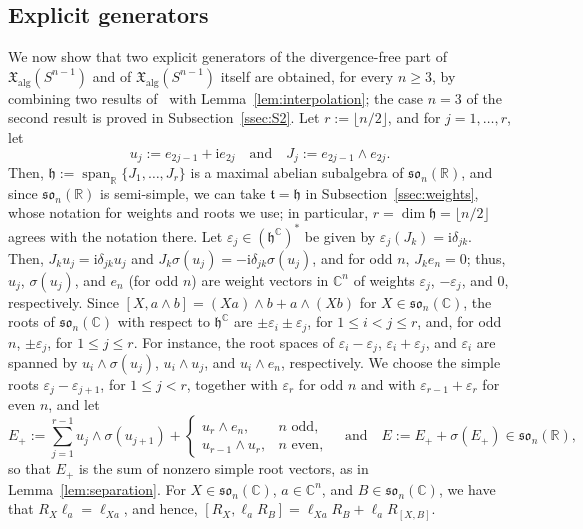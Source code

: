 \documentclass{article}
\newcommand{\R}{\mathbb{R}}
\newcommand{\C}{\mathbb{C}}
\newcommand{\frakt}{\mathfrak{t}}
\newcommand{\frakh}{\mathfrak{h}}
\newcommand{\xalg}{\mathfrak X_{\mathrm{alg}}}
\theoremstyle{definition}
\theoremstyle{plain}
\begin{document}
\subsection{Explicit generators}\label{ssec:lukatskii}

We now show that two explicit generators of the divergence-free part of $\xalg(S^{n-1})$ and of $\xalg(S^{n-1})$ itself are obtained, for every $n\geq3$, by combining two results of~\cite{Luk77} with Lemma~\ref{lem:interpolation}; the case $n=3$ of the second result is proved in Subsection~\ref{ssec:S2}.
Let $r:=\lfloor n/2\rfloor$, and for $j=1,\ldots,r$, let
$$
    u_j:=e_{2j-1}+\mathrm{i}e_{2j} \quad\mbox{and}\quad
    J_j:=e_{2j-1}\wedge e_{2j}.
$$
Then, $\frakh:=\operatorname{span}_\R\{J_1,\ldots,J_r\}$ is a maximal abelian subalgebra of $\mathfrak{so}_n(\R)$, and since $\mathfrak{so}_n(\R)$ is semi-simple, we can take $\frakt=\frakh$ in Subsection~\ref{ssec:weights}, whose notation for weights and roots we use; in particular, $r=\dim\frakh=\lfloor n/2\rfloor$ agrees with the notation there.
Let $\varepsilon_j\in(\frakh^\C)^*$ be given by $\varepsilon_j(J_k)=\mathrm{i}\delta_{jk}$.
Then, $J_ku_j=\mathrm{i}\delta_{jk}u_j$ and $J_k\sigma(u_j)=-\mathrm{i}\delta_{jk}\sigma(u_j)$, and for odd $n$, $J_ke_n=0$; thus, $u_j$, $\sigma(u_j)$, and $e_n$ (for odd $n$) are weight vectors in $\C^n$ of weights $\varepsilon_j$, $-\varepsilon_j$, and $0$, respectively.
Since $[X,a\wedge b]=(Xa)\wedge b+a\wedge(Xb)$ for $X\in\mathfrak{so}_n(\C)$, the roots of $\mathfrak{so}_n(\C)$ with respect to $\frakh^\C$ are $\pm\varepsilon_i\pm\varepsilon_j$, for $1\leq i<j\leq r$, and, for odd $n$, $\pm\varepsilon_j$, for $1\leq j\leq r$.
For instance, the root spaces of $\varepsilon_i-\varepsilon_j$, $\varepsilon_i+\varepsilon_j$, and $\varepsilon_i$ are spanned by $u_i\wedge\sigma(u_j)$, $u_i\wedge u_j$, and $u_i\wedge e_n$, respectively.
We choose the simple roots $\varepsilon_j-\varepsilon_{j+1}$, for $1\leq j<r$, together with $\varepsilon_r$ for odd $n$ and with $\varepsilon_{r-1}+\varepsilon_r$ for even $n$, and let
\begin{equation}\label{eq:sphere-E}
E_+ := \sum_{j=1}^{r-1}u_j\wedge\sigma(u_{j+1})+
\begin{cases}
u_r \wedge e_n, & n\mbox{ odd},\\
u_{r-1} \wedge u_r, & n\mbox{ even},
\end{cases}
\quad \mbox{and} \quad
E:= E_+ + \sigma(E_+)\in\mathfrak{so}_n(\R),
\end{equation}
so that $E_+$ is the sum of nonzero simple root vectors, as in Lemma~\ref{lem:separation}.
For $X\in\mathfrak{so}_n(\C)$, $a\in\C^n$, and $B\in\mathfrak{so}_n(\C)$, we have that $R_X\ell_a=\ell_{Xa}$, and hence, $[R_X,\ell_aR_B]=\ell_{Xa}R_B+\ell_aR_{[X,B]}$.
\end{document}
